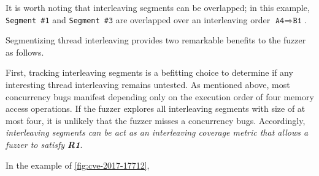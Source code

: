 

%
It is worth noting that interleaving segments can be overlapped; in
this example, \texttt{Segment \#1} and \texttt{Segment \#3} are
overlapped over an interleaving order
$\texttt{A4} \Rightarrow \texttt{B1}$.




%
Segmentizing thread interleaving provides two remarkable benefits to
the fuzzer as follows.



First, tracking interleaving segments is a befitting choice to
determine if any interesting thread interleaving remains untested.
%
As mentioned above, most concurrency bugs manifest depending only on
the execution order of four memory access operations. If the fuzzer
explores all interleaving segments with size of at most four, it is
unlikely that the fuzzer misses a concurrency bugs.
%
Accordingly, \textit{interleaving segments can be act as an
  interleaving coverage metric that allows a fuzzer to satisfy
  \textbf{R1}}.
  

In the example of \autoref{fig:cve-2017-17712}, 




